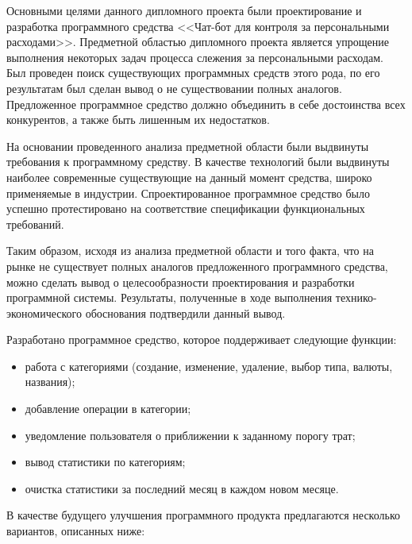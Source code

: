 
Основными целями данного дипломного проекта были проектирование и разработка программного средства <<Чат-бот для контроля за персональными расходами>>. Предметной областью дипломного проекта является упрощение выполнения некоторых задач процесса слежения за персональными расходам. Был проведен поиск существующих программных средств этого рода, по его результатам был сделан вывод о не существовании полных аналогов. Предложенное программное средство должно объединить в себе достоинства всех конкурентов, а также быть лишенным их недостатков.

На основании проведенного анализа предметной области были выдвинуты требования к программному средству. В качестве технологий были выдвинуты наиболее современные существующие на данный момент средства, широко применяемые в индустрии. Спроектированное программное средство было успешно протестировано на соответствие спецификации функциональных требований. 

Таким образом, исходя из анализа предметной области и того факта, что на рынке не существует полных аналогов предложенного программного средства, можно сделать вывод о целесообразности проектирования и разработки программной системы. Результаты, полученные в ходе выполнения технико-экономического обоснования подтвердили данный вывод.

Разработано программное средство, которое поддерживает следующие функции:
\begin{itemize}
	\item работа с категориями (создание, изменение, удаление, выбор типа, валюты, названия);
	\item добавление операции в категории;
	\item уведомление пользователя о приближении к заданному порогу трат;
	\item вывод статистики по категориям;
	\item очистка статистики за последний месяц в каждом новом месяце.
\end{itemize}

В качестве будущего улучшения программного продукта предлагаются несколько вариантов, описанных ниже:

